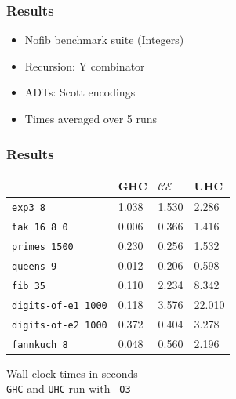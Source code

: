 \documentclass[14pt,mathserif]{beamer}
\begin{document}
\begin{frame}
\frametitle{Results}
\begin{itemize}
\item Nofib benchmark suite (Integers)
\item Recursion: Y combinator
\item ADTs: Scott encodings
\item Times averaged over 5 runs
\end{itemize}
\end{frame}


\begin{frame}[fragile]
\frametitle{Results}
\centering
\small
\begin{tabularx}{\textwidth}{l | X | g | X}
& GHC & $\mathcal{CE}$ & UHC \\
\hline
\texttt{exp3 8} & 1.038 & 1.530 & 2.286 \\
\texttt{tak 16 8 0} & 0.006 & 0.366 & 1.416 \\
\texttt{primes 1500} & 0.230 & 0.256 & 1.532 \\
\texttt{queens 9} & 0.012 & 0.206 & 0.598 \\
\texttt{fib 35} &  0.110 & 2.234 & 8.342 \\
\texttt{digits-of-e1 1000} & 0.118 & 3.576 & 22.010 \\
\texttt{digits-of-e2 1000} & 0.372 & 0.404 & 3.278 \\
\texttt{fannkuch 8} & 0.048 & 0.560 & 2.196 
\end{tabularx}
\begin{center}
Wall clock times in seconds \\
\texttt{GHC} and \texttt{UHC} run with \texttt{-O3}
\end{center}
\end{frame}
\end{document}

